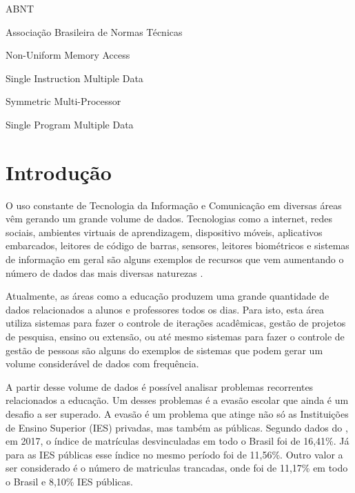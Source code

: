 \documentclass[diss,capa]{texufpel}
\begin{document}
\begin{listofabbrv}{ABNT}%
        \item[ABNT] Associação Brasileira de Normas Técnicas
        \item[NUMA] Non-Uniform Memory Access
        \item[SIMD] Single Instruction Multiple Data
        \item[SMP] Symmetric Multi-Processor
        \item[SPMD] Single Program Multiple Data
\end{listofabbrv}

\tableofcontents

\chapter{Introdução}

O uso constante de Tecnologia da Informação e Comunicação em diversas áreas vêm gerando um grande volume de dados. Tecnologias como a internet, redes sociais, ambientes virtuais de aprendizagem, dispositivo móveis, aplicativos embarcados, leitores de código de barras, sensores, leitores biométricos e sistemas de informação em geral são alguns exemplos de recursos que vem aumentando o número de dados das mais diversas naturezas \cite{goldschmidt2015data}.

Atualmente, as áreas como a educação produzem uma grande quantidade de dados relacionados a alunos e professores todos os dias. Para isto, esta área utiliza sistemas para fazer o controle de iterações acadêmicas, gestão de projetos de pesquisa, ensino ou extensão, ou até mesmo sistemas para fazer o controle de gestão de pessoas são alguns do exemplos de sistemas que podem gerar um volume considerável de dados com frequência.

A partir desse volume de dados é possível analisar problemas recorrentes relacionados a educação. Um desses problemas é a evasão escolar que ainda é um desafio a ser superado.
A evasão é um problema que atinge não só as Instituições de Ensino Superior (IES) privadas, mas também as públicas. Segundo dados do \citet{inep:2018}, em 2017, o índice de matrículas desvinculadas em todo o Brasil foi de 16,41\%. Já para as IES públicas esse índice no mesmo período foi de 11,56\%. Outro valor a ser considerado é o número de matriculas trancadas, onde foi de 11,17\% em todo o Brasil e 8,10\% IES públicas.
\end{document}
